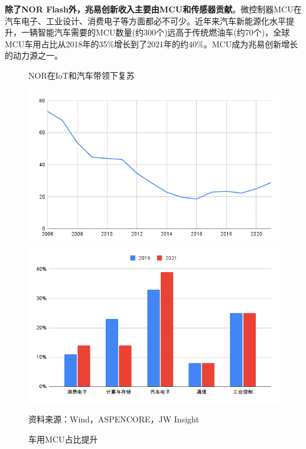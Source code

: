 \documentclass[a4paper,12pt]{ctexart}
\begin{document}
\textbf{除了NOR Flash外，兆易创新收入主要由MCU和传感器贡献}。微控制器MCU在汽车电子、工业设计、消费电子等方面都必不可少。近年来汽车新能源化水平提升，一辆智能汽车需要的MCU数量(约300个)远高于传统燃油车(约70个)，全球MCU车用占比从2018年的35\%增长到了2021年的约40\%。MCU成为兆易创新增长的动力源之一。
\begin{figure}[H]
    \begin{minipage}{0.48\linewidth}
        \caption{NOR在IoT和汽车带领下复苏}
        \centering
        \includegraphics[width=\linewidth]{img/norflash.png}
    \end{minipage}
    \begin{minipage}{0.48\linewidth}
        \caption{车用MCU占比提升}
        \centering
        \includegraphics[width=\linewidth]{img/mcu.png}
    \end{minipage}\par
    \footnotesize{资料来源：Wind，ASPENCORE，JW Insight}
\end{figure}
\end{document}
